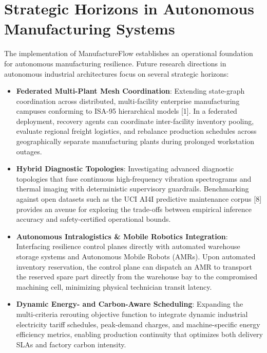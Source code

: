 \documentclass[10pt,twocolumn,a4paper]{article}
\begin{document}
\section{Strategic Horizons in Autonomous Manufacturing Systems}
\label{sec:horizons}
The implementation of ManufactureFlow establishes an operational foundation for autonomous manufacturing resilience. Future research directions in autonomous industrial architectures focus on several strategic horizons:

\begin{itemize}
    \item \textbf{Federated Multi-Plant Mesh Coordination}: Extending state-graph coordination across distributed, multi-facility enterprise manufacturing campuses conforming to ISA-95 hierarchical models [1]. In a federated deployment, recovery agents can coordinate inter-facility inventory pooling, evaluate regional freight logistics, and rebalance production schedules across geographically separate manufacturing plants during prolonged workstation outages.
    \item \textbf{Hybrid Diagnostic Topologies}: Investigating advanced diagnostic topologies that fuse continuous high-frequency vibration spectrograms and thermal imaging with deterministic supervisory guardrails. Benchmarking against open datasets such as the UCI AI4I predictive maintenance corpus [8] provides an avenue for exploring the trade-offs between empirical inference accuracy and safety-certified operational bounds.
    \item \textbf{Autonomous Intralogistics \& Mobile Robotics Integration}: Interfacing resilience control planes directly with automated warehouse storage systems and Autonomous Mobile Robots (AMRs). Upon automated inventory reservation, the control plane can dispatch an AMR to transport the reserved spare part directly from the warehouse bay to the compromised machining cell, minimizing physical technician transit latency.
    \item \textbf{Dynamic Energy- and Carbon-Aware Scheduling}: Expanding the multi-criteria rerouting objective function to integrate dynamic industrial electricity tariff schedules, peak-demand charges, and machine-specific energy efficiency metrics, enabling production continuity that optimizes both delivery SLAs and factory carbon intensity.
\end{itemize}

\end{document}
